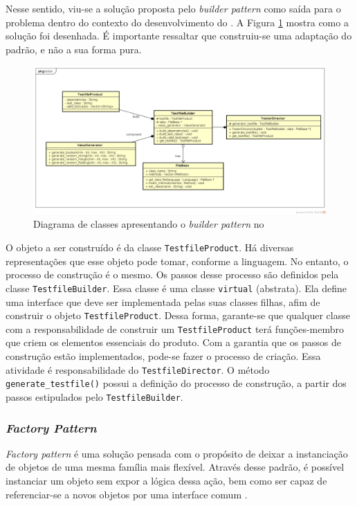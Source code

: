 Nesse sentido, viu-se a solução proposta pelo \textit{builder pattern}
como saída para o problema dentro do contexto do desenvolvimento do
\Scarefault. A Figura \ref{testfile-diagram} mostra como a solução
foi desenhada. É importante ressaltar que construiu-se uma adaptação do
padrão, e não a sua forma pura.

\begin{figure}[h]
  \centering
    \includegraphics[width=\textwidth]{figuras/testfile-diagram.png}
    \caption{Diagrama de classes apresentando o \textit{builder pattern} no \framework}
    \label{testfile-diagram}
\end{figure}
\FloatBarrier

O objeto a ser construído é da classe \lstinline|TestfileProduct|. Há
diversas representações que esse objeto pode tomar, conforme a linguagem.
No entanto, o processo de construção é o mesmo. Os passos desse processo são definidos
pela classe \lstinline|TestfileBuilder|. Essa classe é uma classe
\lstinline|virtual| (abstrata). Ela define uma interface que deve ser
implementada pelas suas classes filhas, afim de construir o objeto
\lstinline|TestfileProduct|. Dessa forma, garante-se que qualquer
classe com a responsabilidade de construir um \lstinline|TestfileProduct|
terá funções-membro que criem os elementos essenciais do produto. Com a garantia
que os passos de construção estão implementados, pode-se fazer o processo de
criação. Essa atividade é responsabilidade do \lstinline|TestfileDirector|. O
método \lstinline|generate_testfile()| possui a definição do processo de
construção, a partir dos passos estipulados pelo \lstinline|TestfileBuilder|.

\subsubsection{\textit{Factory Pattern}} \label{subsec-factory-pattern}
\textit{Factory pattern} é uma solução pensada com o propósito de deixar a
instanciação de objetos de uma mesma família mais flexível. Através desse
padrão,  é possível instanciar um objeto sem expor a lógica dessa ação, bem
como ser capaz de referenciar-se a novos objetos por uma interface comum
\cite{gammaEtAl1994}.

